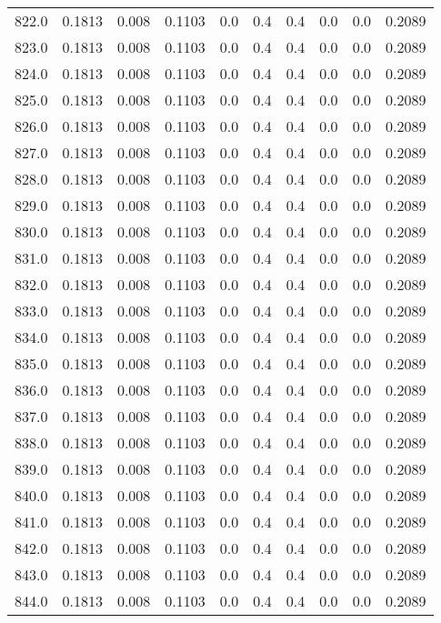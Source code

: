 \begin{longtable}{lrrrrrrrrr}
822.0 & 0.1813 & 0.008 & 0.1103 & 0.0 & 0.4 & 0.4 & 0.0 & 0.0 & 0.2089 \\
823.0 & 0.1813 & 0.008 & 0.1103 & 0.0 & 0.4 & 0.4 & 0.0 & 0.0 & 0.2089 \\
824.0 & 0.1813 & 0.008 & 0.1103 & 0.0 & 0.4 & 0.4 & 0.0 & 0.0 & 0.2089 \\
825.0 & 0.1813 & 0.008 & 0.1103 & 0.0 & 0.4 & 0.4 & 0.0 & 0.0 & 0.2089 \\
826.0 & 0.1813 & 0.008 & 0.1103 & 0.0 & 0.4 & 0.4 & 0.0 & 0.0 & 0.2089 \\
827.0 & 0.1813 & 0.008 & 0.1103 & 0.0 & 0.4 & 0.4 & 0.0 & 0.0 & 0.2089 \\
828.0 & 0.1813 & 0.008 & 0.1103 & 0.0 & 0.4 & 0.4 & 0.0 & 0.0 & 0.2089 \\
829.0 & 0.1813 & 0.008 & 0.1103 & 0.0 & 0.4 & 0.4 & 0.0 & 0.0 & 0.2089 \\
830.0 & 0.1813 & 0.008 & 0.1103 & 0.0 & 0.4 & 0.4 & 0.0 & 0.0 & 0.2089 \\
831.0 & 0.1813 & 0.008 & 0.1103 & 0.0 & 0.4 & 0.4 & 0.0 & 0.0 & 0.2089 \\
832.0 & 0.1813 & 0.008 & 0.1103 & 0.0 & 0.4 & 0.4 & 0.0 & 0.0 & 0.2089 \\
833.0 & 0.1813 & 0.008 & 0.1103 & 0.0 & 0.4 & 0.4 & 0.0 & 0.0 & 0.2089 \\
834.0 & 0.1813 & 0.008 & 0.1103 & 0.0 & 0.4 & 0.4 & 0.0 & 0.0 & 0.2089 \\
835.0 & 0.1813 & 0.008 & 0.1103 & 0.0 & 0.4 & 0.4 & 0.0 & 0.0 & 0.2089 \\
836.0 & 0.1813 & 0.008 & 0.1103 & 0.0 & 0.4 & 0.4 & 0.0 & 0.0 & 0.2089 \\
837.0 & 0.1813 & 0.008 & 0.1103 & 0.0 & 0.4 & 0.4 & 0.0 & 0.0 & 0.2089 \\
838.0 & 0.1813 & 0.008 & 0.1103 & 0.0 & 0.4 & 0.4 & 0.0 & 0.0 & 0.2089 \\
839.0 & 0.1813 & 0.008 & 0.1103 & 0.0 & 0.4 & 0.4 & 0.0 & 0.0 & 0.2089 \\
840.0 & 0.1813 & 0.008 & 0.1103 & 0.0 & 0.4 & 0.4 & 0.0 & 0.0 & 0.2089 \\
841.0 & 0.1813 & 0.008 & 0.1103 & 0.0 & 0.4 & 0.4 & 0.0 & 0.0 & 0.2089 \\
842.0 & 0.1813 & 0.008 & 0.1103 & 0.0 & 0.4 & 0.4 & 0.0 & 0.0 & 0.2089 \\
843.0 & 0.1813 & 0.008 & 0.1103 & 0.0 & 0.4 & 0.4 & 0.0 & 0.0 & 0.2089 \\
844.0 & 0.1813 & 0.008 & 0.1103 & 0.0 & 0.4 & 0.4 & 0.0 & 0.0 & 0.2089 \\

\end{longtable}

